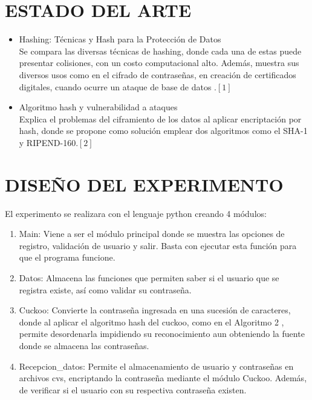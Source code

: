 \documentclass[final,a4paper,twocolumn,romanappendices]{IEEEtran}
\begin{document}
\section{ESTADO DEL ARTE}

\begin{itemize}

\item
Hashing: Técnicas y Hash para la Protección de Datos \\
Se compara las diversas técnicas de hashing, donde cada una de estas puede presentar colisiones, con un costo computacional alto. Además, muestra sus diversos  usos  como en el cifrado de contraseñas, en creación de certificados digitales, cuando ocurre un ataque de base de datos .$[1]$

\item
Algoritmo hash y vulnerabilidad a ataques\\
Explica el problemas del ciframiento de los datos al aplicar encriptación por hash, donde se propone como solución emplear dos algoritmos como el SHA-1 y RIPEND-160.$[2]$
\end{itemize}


\section{DISEÑO DEL EXPERIMENTO}
El experimento se realizara con el lenguaje python creando 4 módulos:
\begin{enumerate}
    \item Main: Viene a ser el módulo principal donde se muestra las opciones de registro, validación de usuario y salir. Basta con ejecutar esta función para que el programa funcione.
    \item Datos: Almacena las funciones que permiten saber si el usuario que se registra existe, así como validar su contraseña.
    \item Cuckoo: Convierte la contraseña ingresada en una sucesión de caracteres, donde al aplicar el algoritmo hash del cuckoo, como en el Algoritmo 2 , permite desordenarla impidiendo su reconocimiento aun obteniendo la fuente donde se almacena las contraseñas.\\
     \item Recepcion\_datos: Permite el almacenamiento de usuario y contraseñas en archivos cvs, encriptando la contraseña mediante el módulo Cuckoo. Además, de verificar si el usuario con su respectiva contraseña existen.
\end{enumerate}
\end{document}
